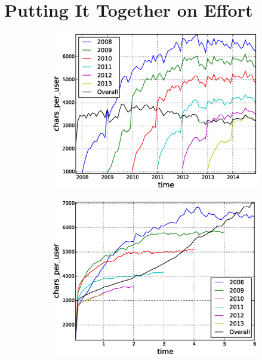 \section{Putting It Together on Effort}  %

\begin{figure}[!tb]
\centering
\begin{subfigure}{.49\textwidth}\includegraphics[scale=0.4]{./images/avr_comment_size_user_over_time_cohorts.eps}\caption{}\end{subfigure}
\begin{subfigure}{.49\textwidth}\includegraphics[scale=0.4]{./images/avr_comment_size_user_cohorts.eps}\caption{}\end{subfigure}

\end{figure}
